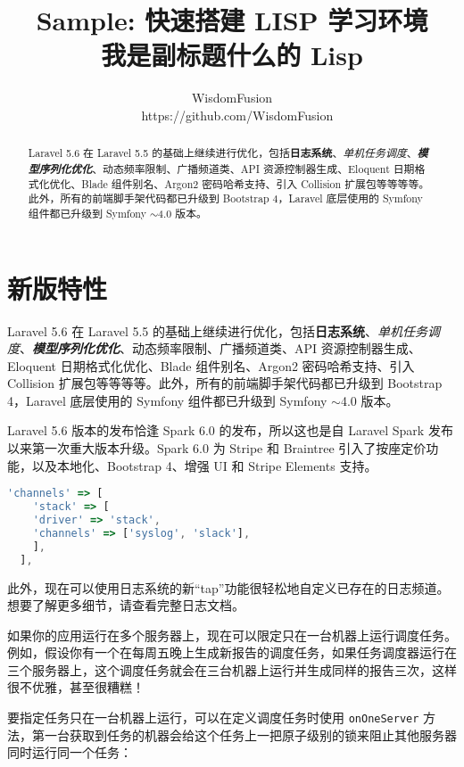 \documentclass{progartcn}
\title{\bfseries\sffamily
  Sample: 快速搭建 LISP 学习环境\\
  \normalfont\zihao{-3}
  我是副标题什么的 Lisp
}
\author{WisdomFusion \\ \faGithubAlt~ https://github.com/WisdomFusion}
\date{}
\begin{document}
\maketitle
\thispagestyle{empty}


\begin{abstract}
\noindent Laravel 5.6 在 Laravel 5.5 的基础上继续进行优化，包括\textbf{日志系统}、\textit{单机任务调度}、\textbf{\textit{模型序列化优化}}、动态频率限制、广播频道类、API 资源控制器生成、Eloquent 日期格式化优化、Blade 组件别名、Argon2 密码哈希支持、引入 Collision 扩展包等等等等。此外，所有的前端脚手架代码都已升级到 Bootstrap 4，Laravel 底层使用的 Symfony 组件都已升级到 Symfony $\sim$4.0 版本。
\end{abstract}

\section{新版特性}
\label{newfeatures}

Laravel 5.6 在 Laravel 5.5 的基础上继续进行优化，包括\textbf{日志系统}、\textit{单机任务调度}、\textbf{\textit{模型序列化优化}}、动态频率限制、广播频道类、API 资源控制器生成、Eloquent 日期格式化优化、Blade 组件别名、Argon2 密码哈希支持、引入 Collision 扩展包等等等等。此外，所有的前端脚手架代码都已升级到 Bootstrap 4，Laravel 底层使用的 Symfony 组件都已升级到 Symfony $\sim$4.0 版本。

Laravel 5.6 版本的发布恰逢 Spark 6.0 的发布，所以这也是自 Laravel Spark 发布以来第一次重大版本升级。Spark 6.0 为 Stripe 和 Braintree 引入了按座定价功能，以及本地化、Bootstrap 4、增强 UI 和 Stripe Elements 支持。


\begin{lstlisting}[language=JavaScript,caption={test/json.json}]
  'channels' => [
    'stack' => [
    'driver' => 'stack',
    'channels' => ['syslog', 'slack'],
    ],
  ],
\end{lstlisting}

此外，现在可以使用日志系统的新``tap''功能很轻松地自定义已存在的日志频道。想要了解更多细节，请查看完整日志文档。

如果你的应用运行在多个服务器上，现在可以限定只在一台机器上运行调度任务。例如，假设你有一个在每周五晚上生成新报告的调度任务，如果任务调度器运行在三个服务器上，这个调度任务就会在三台机器上运行并生成同样的报告三次，这样很不优雅，甚至很糟糕！

要指定任务只在一台机器上运行，可以在定义调度任务时使用 \verb|onOneServer| 方法，第一台获取到任务的机器会给这个任务上一把原子级别的锁来阻止其他服务器同时运行同一个任务：
\end{document}
